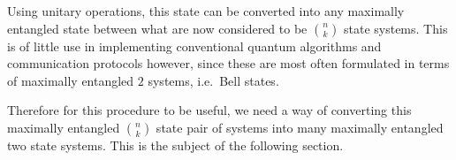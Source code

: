 Using unitary operations, this state can be converted into any maximally entangled state between what are now considered to be $\binom{n}{k}$ state systems.
This is of little use in implementing conventional quantum algorithms and communication protocols however, since these are most often formulated in terms of maximally entangled $2$ systems, i.e.\ Bell states.

Therefore for this procedure to be useful, we need a way of converting this maximally entangled $\binom{n}{k}$ state pair of systems into many maximally entangled two state systems. This is the subject of the following section.
